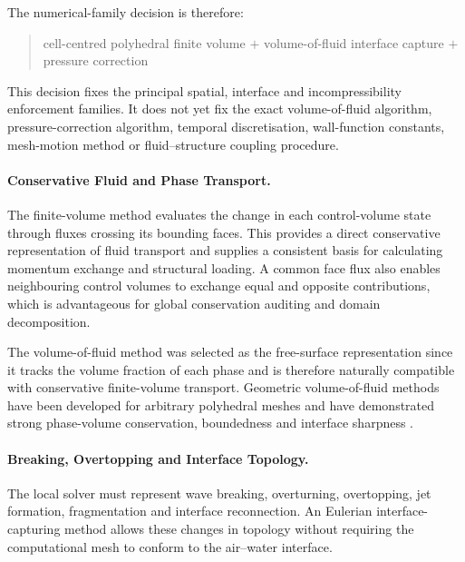 The numerical-family decision is therefore:

\begin{quote}
  \centering
  cell-centred polyhedral finite volume
  $+$ volume-of-fluid interface capture
  $+$ pressure correction
\end{quote}

This decision fixes the principal spatial, interface and
incompressibility enforcement families. It does not yet fix the exact
volume-of-fluid algorithm, pressure-correction algorithm, temporal
discretisation, wall-function constants, mesh-motion method or
fluid--structure coupling procedure.

\paragraph{Conservative Fluid and Phase Transport.}
\label{sec:num-local-three-dimensional-conservation-rationale}

The finite-volume method evaluates the change in each control-volume
state through fluxes crossing its bounding faces. This provides a direct
conservative representation of fluid transport and supplies a consistent
basis for calculating momentum exchange and structural loading. A common
face flux also enables neighbouring control volumes to exchange equal
and opposite contributions, which is advantageous for global
conservation auditing and domain decomposition.

The volume-of-fluid method was selected as the free-surface
representation since it tracks the volume fraction of each phase and is
therefore naturally compatible with conservative finite-volume
transport. Geometric volume-of-fluid methods have been developed for
arbitrary polyhedral meshes and have demonstrated strong phase-volume
conservation, boundedness and interface sharpness
\parencite{roenby2016computational}.

\paragraph{Breaking, Overtopping and Interface Topology.}
\label{sec:num-local-three-dimensional-interface-topology-rationale}

The local solver must represent wave breaking, overturning, overtopping,
jet formation, fragmentation and interface reconnection. An Eulerian
interface-capturing method allows these changes in topology without
requiring the computational mesh to conform to the air--water interface.

